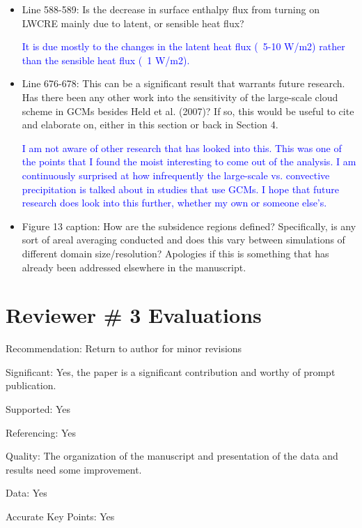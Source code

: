 \documentclass[draft]{agujournal2019}
\begin{document}
\begin{itemize}
  \item Line 588-589: Is the decrease in surface enthalpy flux from turning on LWCRE mainly due to latent, or sensible heat flux?  
  
  \textcolor{blue}{It is due mostly to the changes in the latent heat flux (~5-10 W/m2) rather than the sensible heat flux (~1 W/m2).}

  \item Line 676-678: This can be a significant result that warrants future research. Has there been any other work into the sensitivity of the large-scale cloud scheme in GCMs besides Held et al. (2007)? If so, this would be useful to cite and elaborate on, either in this section or back in Section 4.  
  
  \textcolor{blue}{I am not aware of other research that has looked into this.  This was one of the points that I found the moist interesting to come out of the analysis.  I am continuously surprised at how infrequently the large-scale vs. convective precipitation is talked about in studies that use GCMs.  I hope that future research does look into this further, whether my own or someone else’s.}
  
  \item Figure 13 caption: How are the subsidence regions defined? Specifically, is any sort of areal averaging conducted and does this vary between simulations of different domain size/resolution? Apologies if this is something that has already been addressed elsewhere in the manuscript.   
\end{itemize}

\section{Reviewer \# 3 Evaluations}

Recommendation: Return to author for minor revisions

Significant: Yes, the paper is a significant contribution and worthy of prompt publication.

Supported: Yes

Referencing: Yes

Quality: The organization of the manuscript and presentation of the data and results need some improvement.

Data: Yes

Accurate Key Points: Yes
\end{document}
